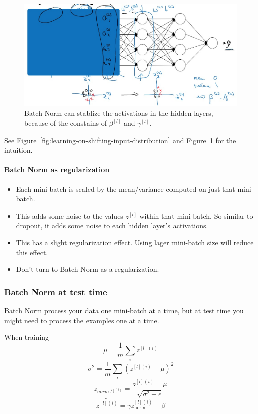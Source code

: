 \documentclass[UTF8]{article}
\newcommand{\Vector}[1]{\boldsymbol{\mathit{#1}}}   %
\begin{document}
\begin{figure}[htb]
    \centering
    \includegraphics[width=40em]{figures/batch-norm-stable-activations}
    \caption{Batch Norm can stablize the activations in the hidden layers, because of the constains
    of $\beta^{[l]}$ and $\gamma^{[l]}$.}
    \label{fig:batch-norm-stable-activations}
\end{figure}

See Figure~\ref{fig:learning-on-shifting-input-distribution} and
Figure~\ref{fig:batch-norm-stable-activations} for the intuition.

\paragraph{Batch Norm as regularization}
\begin{itemize}
    \item Each mini-batch is scaled by the mean/variance computed on just that mini-batch.
    \item This adds some noise to the values $z^{[l]}$ within that mini-batch. So similar to
    dropout, it adds some noise to each hidden layer's activations.
    \item This has a slight regularization effect. Using lager mini-batch size will reduce this
    effect.
    \item Don't turn to Batch Norm as a regularization.
\end{itemize}

\subsubsection{Batch Norm at test time}
Batch Norm process your data one mini-batch at a time, but at test time you might need to process
the examples one at a time.

When training
$$\displaystyle \mu = \frac{1}{m} \sum_{i} \Vector{z^{[l](i)}}$$
$$\displaystyle \sigma^2 = \frac{1}{m} \sum_i (\Vector{z^{[l](i)}} - \mu)^2$$
$$\displaystyle \Vector{z_{\text{norm}^{[l](i)}}} = \frac{\Vector{z^{[l](i)}}-\mu}
{\sqrt{\sigma^2 + \epsilon}}$$
$$\displaystyle \widetilde{z^{[l](i)}} = \gamma z_{\text{norm}}^{[l](i)} + \beta$$
\end{document}

